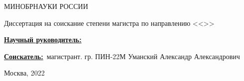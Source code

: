 \begin{frame}
    \begin{center}
        МИНОБРНАУКИ РОССИИ \\
        \thesisOrganization

        \textbf{\large \thesisTitle}
        \newline

        Диссертация на соискание степени магистра по направлению \thesisSpecialtyNumber <<\thesisSpecialtyTitle>>
    \end{center}

    \underline{\textbf{Научный руководитель:}}~\supervisorRegaliaShort~\supervisorFio

    \underline{\textbf{Соискатель:}}~магистрант. гр. ПИН-22М Уманский Александр Александрович

    \begin{center}
        Москва, 2022
    \end{center}

\end{frame}
